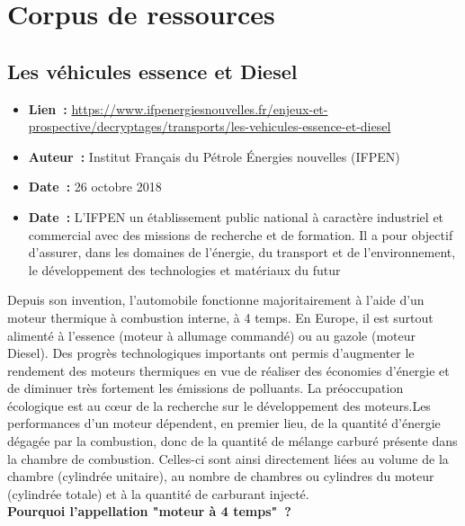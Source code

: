 \documentclass[8pt]{article}
\begin{document}
\newpage
\section{Corpus de ressources}

\subsection{Les véhicules essence et Diesel}
\label{sec:essencediesel}

\begin{itemize}
	\item \textbf{Lien~: } \url{https://www.ifpenergiesnouvelles.fr/enjeux-et-prospective/decryptages/transports/les-vehicules-essence-et-diesel} 
	\item \textbf{Auteur~: } Institut Français du Pétrole Énergies nouvelles (IFPEN)
	\item \textbf{Date~: } 26 octobre 2018
	\item \textbf{Date~: } L'IFPEN un établissement public national à caractère industriel et commercial avec des missions de recherche et de formation. Il a pour objectif d'assurer, dans les domaines de l’énergie, du transport et de l’environnement, le développement des technologies et matériaux du futur
\end{itemize}

Depuis son invention, l’automobile fonctionne majoritairement à l’aide d’un moteur thermique à combustion interne, à 4 temps. En Europe, il est surtout alimenté à l’essence (moteur à allumage commandé) ou au gazole (moteur Diesel).
Des progrès technologiques importants ont permis d’augmenter le rendement des moteurs thermiques en vue de réaliser des économies d’énergie et de diminuer très fortement les émissions de polluants. La préoccupation écologique est au cœur de la recherche sur le développement des moteurs.Les performances d'un moteur dépendent, en premier lieu, de la quantité d'énergie dégagée par la combustion, donc de la quantité de mélange carburé présente dans la chambre de combustion. Celles-ci sont ainsi directement liées au volume de la chambre (cylindrée unitaire), au nombre de chambres ou cylindres du moteur (cylindrée totale) et à la quantité de carburant injecté.\\

\textbf{Pourquoi l’appellation "moteur à 4 temps"~?}\\
\end{document}
